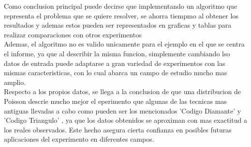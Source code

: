 




Como conclusion principal puede decirse que implementando un algoritmo que representa el problema que se quiere resolver, se ahorra tiempmo al obtener los resultados y ademas estos pueden ser representados en graficas y tablas para realizar comparaciones con otros experimentos\\
Ademas, el algoritmo no es valido unicamente para el ejemplo en el que se centra el informe, ya que al describir la misma funcion, simplemente cambiando lso datos de entrada puede adaptarse a gran variedad de experimentos con las mismas caracteristicas, con lo cual abarca un campo de estudio mucho mas amplio.\\
Respecto a los propios datos, se llega a la conclusion de que una distribucion de Poisson descrie mucho mejor el eperimento que algunas de las tecnicas mas antiguas llevadas a cabo como pueden ser los mencionados 'Codigo Diamante'  y 'Codigo Triangulo' , ya que los datos obtenidos se aproximan con mas exactitud a los reales observados. Este hecho asegura cierta confianza en posibles futuras aplicaciones del experimento en diferentes campos.